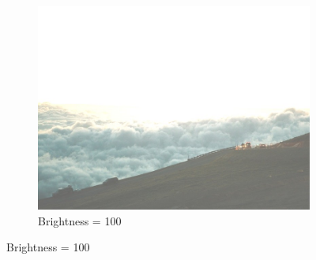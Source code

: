 \documentclass{article}
\begin{document}
\begin{itemize}
\begin{figure}[h]
\begin{subfigure}{.45\textwidth}
      \end{subfigure}
      \hspace{1cm}
      \begin{subfigure}{.45\textwidth}
        \includegraphics[width=\linewidth]{./result/labwork6b-gpu-out.jpg}
        \caption{Brightness = 100}
      \end{subfigure}
    \end{figure}
\end{itemize}
\end{document}
